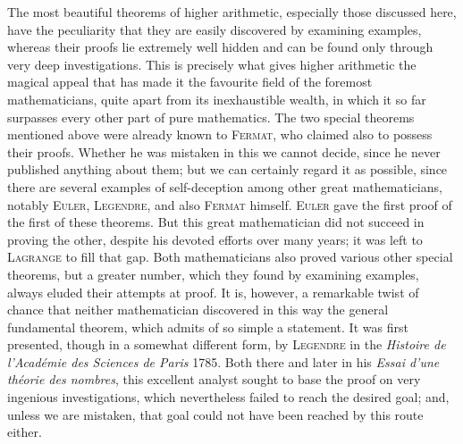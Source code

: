 The most beautiful theorems of higher arithmetic, especially those discussed here, have the peculiarity that they are easily discovered by examining examples, whereas their proofs lie extremely well hidden and can be found only through very deep investigations. This is precisely what gives higher arithmetic the magical appeal that has made it the favourite field of the foremost mathematicians, quite apart from its inexhaustible wealth, in which it so far surpasses every other part of pure mathematics. The two special theorems mentioned above were already known to \textsc{Fermat}, who claimed also to possess their proofs. Whether he was mistaken in this we cannot decide, since he never published anything about them; but we can certainly regard it as possible, since there are several examples of self-deception among other great mathematicians, notably \textsc{Euler}, \textsc{Legendre}, and also \textsc{Fermat} himself. \textsc{Euler} gave the first proof of the first of these theorems. But this great mathematician did not succeed in proving the other, despite his devoted efforts over many years; it was left to \textsc{Lagrange} to fill that gap. Both mathematicians also proved various other special theorems, but a greater number, which they found by examining examples, always eluded their attempts at proof. It is, however, a remarkable twist of chance that neither mathematician discovered in this way the general fundamental theorem, which admits of so simple a statement. It was first presented, though in a somewhat different form, by \textsc{Legendre} in the \emph{Histoire de l'Académie des Sciences de Paris} 1785. Both there and later in his \emph{Essai d'une théorie des nombres},
%
this excellent analyst sought to base the proof on very ingenious investigations, which nevertheless failed to reach the desired goal; and, unless we are mistaken, that goal could not have been reached by this route either.

